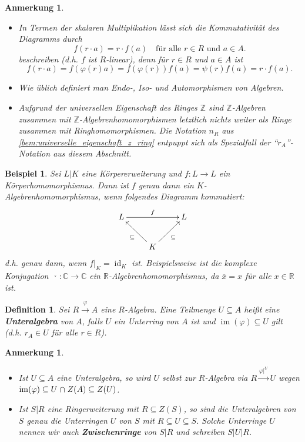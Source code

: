 \documentclass[a4paper, twoside, 11pt, ngerman]{report}
\newcommand{\CC}{\mathds C}
\newcommand{\RR}{\mathds R}
\newcommand{\ZZ}{\mathds Z}
\DeclareMathOperator{\ident}{id}
\renewcommand{\cap}{\;\rotatebox{90}{\reflectbox{\rotatebox{270}{$\cup$}}}\;}
\theoremstyle{definistyle}
\newtheorem{defini}[satz]{Definition}
\newtheorem{anm}[satz]{Anmerkung}
\newtheorem{bsp}[satz]{Beispiel}
\theoremstyle{remark}
\newcommand{\defn}[1]{\textit{\bfseries #1}}
\begin{document}
\begin{anm}\label{anm:R-Algebrenhom_diagramm}
\begin{itemize}
\item
In Termen der skalaren Multiplikation lässt sich die Kommutativität des Diagramms durch 
\[
f(r \cdot a) = r \cdot f(a) \quad \text{für alle } r \in R \text{ und } a \in A.
\]
beschreiben (d.h. $f$ ist $R$-linear), denn für $r\in R$ und $a\in A$ ist
\[
f(r \cdot a) = f(\varphi(r)a) = f(\varphi(r))f(a)=\psi(r)f(a)=r\cdot f(a).
\]
\item Wie üblich definiert man Endo-, Iso- und Automorphismen von Algebren.
\item Aufgrund der universellen Eigenschaft des Ringes $\ZZ$ sind $\ZZ$-Algebren
zusammen mit $\ZZ$-Algebrenhomomorphismen letztlich nichts weiter als Ringe zusammen
mit Ringhomomorphismen. Die Notation $n_R$ aus \ref{bem:universelle_eigenschaft_z_ring}
entpuppt sich als Spezialfall der "`$r_A$"'-Notation aus diesem Abschnitt.
\end{itemize}
\end{anm}

\begin{bsp}\label{bsp:algebrenhomomorphismus}
Sei $L|K$ eine Körpererweiterung und $f \colon L \to L$ ein Körperhomomorphismus. Dann ist $f$ genau dann ein $K$-Algebrenhomomorphismus, wenn folgendes Diagramm kommutiert:
\[
\xymatrix{
L \ar[rr]^f &  & L \\
 & K \ar[ul]^{\subseteq} \ar[ur]_{\subseteq} &
}
\]
d.h. genau dann, wenn $f|_K=\ident_K$ ist.
Beispielsweise ist die komplexe Konjugation $\overline{\,\cdot\,} \colon \CC \to \CC$ ein  $\RR$-Algebrenhomomorphismus, da $\overline{x} = x$ für alle $x \in \RR$ ist.
\end{bsp}

\begin{defini}\label{def:unteralgebra}
Sei $R \xrightarrow{\varphi} A$ eine $R$-Algebra. Eine Teilmenge $U \subseteq A$ heißt eine \defn{Unteralgebra} von $A$, falls $U$ ein Unterring von $A$ ist und $\operatorname{im}(\varphi) \subseteq U$ gilt (d.h. $r_A \in U$ für alle $r \in R$). 
\end{defini}

\begin{anm}\label{anm:unteralgebra}
\begin{itemize}
\item Ist $U \subseteq A$ eine Unteralgebra, so wird $U$ selbst zur $R$-Algebra via $R \xrightarrow{\varphi|^U} U$ wegen $\operatorname{im}(\varphi) \subseteq U\cap Z(A)\subseteq Z(U)$.
\item Ist $S|R$ eine Ringerweiterung mit $R \subseteq Z(S)$, so sind die Unteralgebren von $S$ genau die Unterringen $U$ von $S$ mit $R \subseteq U \subseteq S$. Solche Unterringe $U$ nennen wir auch \defn{Zwischenringe} von $S|R$ und schreiben $S|U|R$.
\end{itemize}
\end{anm}
\end{document}
